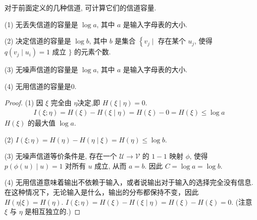 对于前面定义的几种信道, 可计算它们的信道容量.
\begin{theorem}
(1) 无丢失信道的容量是 $ \log a $, 其中 $ a $ 是输入字母表的大小.

(2) 决定信道的容量是 $ \log b $, 其中 $ b $ 是集合
$ \left\{v_{j} \mid\right. $ 存在某个 $ u_{j} $, 使得 $ q\left(v_{j} \mid u_{i}\right)=1 $ 成立 $ \} $
的元素个数.

(3) 无噪声信道的容量是 $ \log a $, 其中 $ a $ 是输入字母表的大小.

(4) 无用信道的容量是0.
\end{theorem}
\begin{proof}
(1) 因  $\xi$  完全由  $\eta$决定,即 $ H(\xi \mid \eta)=0 $.
$$
\begin{aligned}
I(\xi ; \eta)  =H(\xi)-H(\xi \mid \eta)  =H(\xi)-0  =H(\xi) \leq \log a
\end{aligned}
$$
$ H(\xi) $ 的最大值 $ \log a $.

(2) $ I(\xi ; \eta)=H(\eta)-H(\eta \mid \xi)=H(\eta) \leq \log b $.

(3) 无噪声信道等价条件是, 存在一个 $ \mathscr{U} \rightarrow \mathscr{V} $ 的 $ 1-1 $ 映射 $ \phi $, 使得 $ p(\phi(u) \mid u)=1 $ 对所有 $ u $ 成立, 从而 $ a=b $. 因此 $ C=\log a=\log b $.

(4) 无用信道意味着输出不依赖于输入，或者说输出对于输入的选择完全没有信息.在这种情况下，无论输入是什么，输出的分布都保持不变，因此 \(H(\eta | \xi) = H(\eta)\). $ I(\xi ; \eta)=H(\xi)-H(\xi \mid \eta)=H(\xi)-H(\xi)=0 $. (注意 $ \xi $ 与 $ \eta $ 是相互独立的.)
\end{proof}

